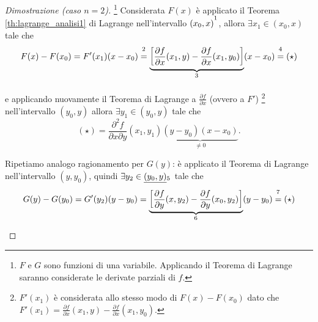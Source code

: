 \begin{proof}[Dimostrazione (caso $n=2$)]
	\footnote{$F$ e $G$ sono funzioni di una variabile. Applicando il Teorema di Lagrange saranno considerate le derivate parziali di $f$.} Considerata $F(x)$ è applicato il Teorema \ref{th:lagrange_analisi1} di Lagrange nell'intervallo $(x_0,x)^{\footnotemark}$,  allora $\exists x_1\in(x_0,x)$ tale che
	\begin{equation*}
		F(x) - F(x_0) = F'(x_1) (x - x_0) \overset{\footnotemark}{=} \underbrace{\left[\frac{\partial f}{\partial x}(x_1, y)- \frac{\partial f}{\partial x}(x_1, y_0)\right]}_{\footnotemark}(x-x_0) \overset{\footnotemark}{=} (\star)
	\end{equation*}
	\addtocounter{footnote}{-2}
	

	
	e applicando nuovamente il Teorema di Lagrange a $\frac{\partial f}{\partial x}$ (ovvero a $F'$) \footnote{$F'(x_1)$ è considerata allo stesso modo di $F(x)-F(x_0)$ dato che $F'(x_1)=\frac{\partial f}{\partial x}(x_1,y) - \frac{\partial f}{\partial x}(x_1,y_0)$.} nell'intervallo $(y_0,y)$ allora $\exists y_1\in(y_0,y)$ tale che
	\begin{equation*}
		(\star) = \frac{\partial^2 f}{\partial x\partial y}(x_1,y_1)\underbrace{(y-y_0)(x-x_0)}_{\neq 0}.
	\end{equation*}
	
	Ripetiamo analogo ragionamento per $G(y)$: è applicato il Teorema di Lagrange nell'intervallo $(y, y_0)$, quindi $\exists y_2\in\uline{(y_0,y)}_{\footnotemark}$ tale che 
	\begin{equation*}
		G(y) - G(y_0) = G'(y_2) (y-y_0) = \underbrace{\left[\frac{\partial f}{\partial y}(x, y_2)- \frac{\partial f}{\partial y}(x_0, y_2)\right]}_{\footnotemark}(y-y_0) \overset{\footnotemark}{=} (\star)
	\end{equation*}
	

\end{proof}
